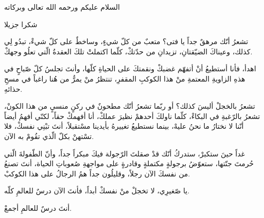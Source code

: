 
\begin{Arabic}

  السلام عليكم ورحمه الله تعالى وبركاته
  \par
  شكرا جزيلا
  \par
  تشعرُ أنّك مرهقٌ جداً يا فتى؟ متعبٌ من كلّ شيءٍ، وساخطٌ على كلّ شيءْ، تبدُو لِي كذلك، وعيناكَ الضيّقتانِ، تزيدانِ من حدّتكْ، كلّما اكتملتْ تلكَ العقدةُ الّتي تعلُو وجهكْ.

  اهدأ، فأنا أستطيعُ أنْ أتفهّم غضبكْ ونقمتكَ على الحياةِ كلّها، وأنتَ تجلسُ كلّ صّباحٍ في هذهِ الزاويةِ المعتمةِ منْ هذا الكوكبِ المقفرِ، تنتظرُ منْ يمرُّ من هُنا راغباً في مسحِ حذائهِ.

  تشعرُ بالخجلْ أليسَ كذلك؟ أو ربّما تشعرُ أنّك مطحونٌ في ركنٍ منسيٍ من هذا الكونْ، تشعرُ بالرّغبةِ في البكاءْ، كلّما ناولكَ أحدهمْ نظيرَ عملكْ، أنا أفهمكْ حقاً، لكنّي أفهمُ أيضاً أنّنا لا نختارُ ما نحنُ عليهْ، بينما نستطيعُ تغييرهُ بأيدينا مسْتقبلاً، أنتَ تبْنِي نفسكْ، فلا تسْتهنْ بكلّ الّذي تقُومْ به الآن.

  غداً حينَ ستكبرْ، ستدركُ أنّك قدْ صقلتَ الرّجولة فيكَ مبكراً جداً، وأنّ الطّفولةَ الّتي حُرمتَ جنّتها، ستعوّضُ برجولةٍ مكتملةٍ وقادرةٍ على مواجهةِ صُعوباتِ الحياة، أنتَ تصنعُ من نفسكَ الآن رجلاً، وقليلُون جداً همُ الرجالُ على هذا الكوكبْ.

  يا صّغيرِي، لا تخجلْ منْ نفسكْ أبداً، فأنتَ الآن درسٌ للعالمِ كلّه.

  أنتَ درسٌ للعالمِ أجمعْ.
\end{Arabic}
